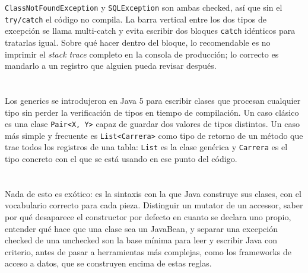 \documentclass[10pt,a4paper]{article}
\begin{document}
\texttt{ClassNotFoundException} y \texttt{SQLException} son ambas checked, así que sin el \texttt{try/catch} el código no compila. La barra vertical entre los dos tipos de excepción se llama multi-catch y evita escribir dos bloques \texttt{catch} idénticos para tratarlas igual. Sobre qué hacer dentro del bloque, lo recomendable es no imprimir el \textit{stack trace} completo en la consola de producción; lo correcto es mandarlo a un registro que alguien pueda revisar después.

\section{\color{colorIPN}{Generics}}

Los generics se introdujeron en Java 5 para escribir clases que procesan cualquier tipo sin perder la verificación de tipos en tiempo de compilación. Un caso clásico es una clase \texttt{Pair<X, Y>} capaz de guardar dos valores de tipos distintos. Un caso más simple y frecuente es \texttt{List<Carrera>} como tipo de retorno de un método que trae todos los registros de una tabla: \texttt{List} es la clase genérica y \texttt{Carrera} es el tipo concreto con el que se está usando en ese punto del código.

\section{\color{colorIPN}{Conclusión}}

Nada de esto es exótico: es la sintaxis con la que Java construye sus clases, con el vocabulario correcto para cada pieza. Distinguir un mutator de un accessor, saber por qué desaparece el constructor por defecto en cuanto se declara uno propio, entender qué hace que una clase sea un JavaBean, y separar una excepción checked de una unchecked son la base mínima para leer y escribir Java con criterio, antes de pasar a herramientas más complejas, como los frameworks de acceso a datos, que se construyen encima de estas reglas.


\pagebreak

\section{\color{colorIPN}{Referencias Bibliográficas}}
\nocite{*}
\color{colorESCOM}{
	\printbibliography[heading=none]
}
\end{document}
